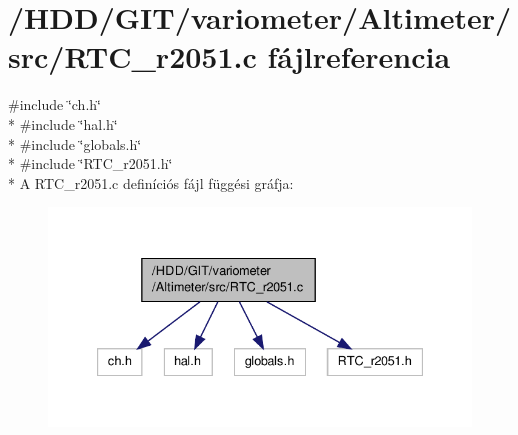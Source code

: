 \section{/\-H\-D\-D/\-G\-I\-T/variometer/\-Altimeter/src/\-R\-T\-C\-\_\-r2051.c fájlreferencia}
\label{_r_t_c__r2051_8c}
{\ttfamily \#include \char`\"{}ch.\-h\char`\"{}}\\*
{\ttfamily \#include \char`\"{}hal.\-h\char`\"{}}\\*
{\ttfamily \#include \char`\"{}globals.\-h\char`\"{}}\\*
{\ttfamily \#include \char`\"{}R\-T\-C\-\_\-r2051.\-h\char`\"{}}\\*
A R\-T\-C\-\_\-r2051.\-c definíciós fájl függési gráfja\-:
\nopagebreak
\begin{figure}[H]
\begin{center}
\leavevmode
\includegraphics[width=336pt]{_r_t_c__r2051_8c__incl}
\end{center}
\end{figure}
